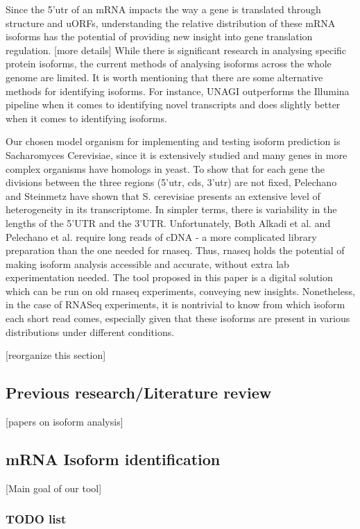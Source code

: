 \documentclass[12pt]{article}
\begin{document}
Since the 5'\acrshort{utr} of an mRNA impacts the way a gene is translated through structure and uORFs, understanding the relative distribution of these mRNA isoforms has the potential of providing new insight into gene translation regulation. [more details] While there is significant research in analysing specific protein isoforms, the current methods of analysing isoforms across the whole genome are limited.  It is worth mentioning that there are some alternative methods for identifying isoforms. For instance, UNAGI\cite{Alkadi2020} outperforms the Illumina pipeline when it comes to identifying novel transcripts and does slightly better when it comes to identifying isoforms. 

Our chosen model organism for implementing and testing isoform prediction is Sacharomyces Cerevisiae, since it is extensively studied and many genes in more complex organisms have homologs in yeast. To show that for each gene the divisions between the three regions (5'\acrshort{utr}, \acrshort{cds}, 3'\acrshort{utr}) are not fixed, Pelechano and Steinmetz \cite{Pelechano2013} have shown that S. cerevisiae presents an extensive level of heterogeneity in its transcriptome. In simpler terms, there is variability in the lengths of the 5’UTR and the 3’UTR. Unfortunately, Both Alkadi et al. \cite{Alkadi2020} and Pelechano et al. \cite{Pelechano2013} require long reads of cDNA - a more complicated library preparation than the one needed for \acrshort{rnaseq}. Thus, \acrshort{rnaseq} holds the potential of making isoform analysis accessible and accurate, without extra lab experimentation needed. The tool proposed in this paper is a digital solution which can be run on old \acrshort{rnaseq} experiments, conveying new insights. Nonetheless, in the case of RNASeq experiments, it is nontrivial to know from which isoform each short read comes, especially given that these isoforms are present in various distributions under different conditions. 

[reorganize this section]

\subsection{Previous research/Literature review}
[papers on isoform analysis]

\subsection{mRNA Isoform  identification }
[Main goal of our tool]
\subsubsection{TODO list}
\end{document}
